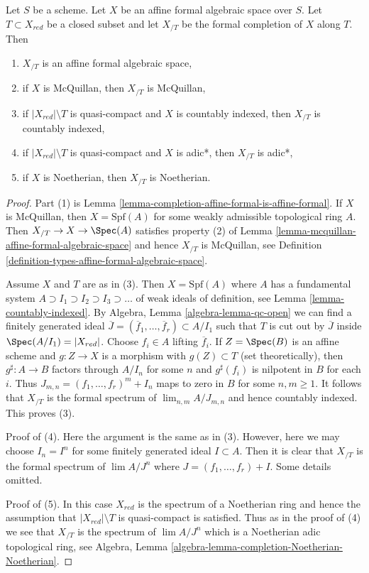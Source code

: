\begin{lemma}
\label{lemma-recompletion-affine-types}
Let $S$ be a scheme. Let $X$ be an affine formal algebraic space over $S$.
Let $T \subset X_{red}$ be a closed subset and let $X_{/T}$
be the formal completion of $X$ along $T$. Then
\begin{enumerate}
\item $X_{/T}$ is an affine formal algebraic space,
\item if $X$ is McQuillan, then $X_{/T}$ is McQuillan,
\item if $|X_{red}| \setminus T$ is quasi-compact and $X$
is countably indexed, then $X_{/T}$ is countably indexed,
\item if $|X_{red}| \setminus T$ is quasi-compact and $X$
is adic*, then $X_{/T}$ is adic*,
\item if $X$ is Noetherian, then $X_{/T}$ is Noetherian.
\end{enumerate}
\end{lemma}

\begin{proof}
Part (1) is Lemma \ref{lemma-completion-affine-formal-is-affine-formal}.
If $X$ is McQuillan, then $X = \text{Spf}(A)$ for some weakly admissible
topological ring $A$. Then $X_{/T} \to X \to \Spec(A)$ satisfies
property (2) of Lemma \ref{lemma-mcquillan-affine-formal-algebraic-space}
and hence $X_{/T}$ is McQuillan, see
Definition \ref{definition-types-affine-formal-algebraic-space}.

\medskip\noindent
Assume $X$ and $T$ are as in (3).
Then $X = \text{Spf}(A)$ where $A$ has a fundamental system
$A \supset I_1 \supset I_2 \supset I_3 \supset \ldots$
of weak ideals of definition, see Lemma \ref{lemma-countably-indexed}.
By Algebra, Lemma \ref{algebra-lemma-qc-open}
we can find a finitely generated ideal
$\overline{J} = (\overline{f}_1, \ldots, \overline{f}_r) \subset A/I_1$
such that $T$ is cut out by $\overline{J}$ inside $\Spec(A/I_1) = |X_{red}|$.
Choose $f_i \in A$ lifting $\overline{f}_i$.
If $Z = \Spec(B)$ is an affine scheme and $g : Z \to X$ is
a morphism with $g(Z) \subset T$ (set theoretically), then
$g^\sharp : A \to B$ factors through $A/I_n$ for some $n$
and $g^\sharp(f_i)$ is nilpotent in $B$ for each $i$. Thus
$J_{m, n} = (f_1, \ldots, f_r)^m + I_n$ maps to zero in $B$
for some $n, m \geq 1$. It follows that $X_{/T}$ is the formal spectrum of
$\lim_{n, m} A/J_{m, n}$ and hence countably indexed.
This proves (3).

\medskip\noindent
Proof of (4). Here the argument is the same as in (3).
However, here we may choose $I_n = I^n$ for some finitely generated ideal
$I \subset A$. Then it is clear that $X_{/T}$ is the formal spectrum of
$\lim A/J^n$ where $J = (f_1, \ldots, f_r) + I$. Some details omitted.

\medskip\noindent
Proof of (5). In this case $X_{red}$ is the spectrum of a Noetherian ring
and hence the assumption that $|X_{red}| \setminus T$ is quasi-compact
is satisfied. Thus as in the proof of (4) we see that
$X_{/T}$ is the spectrum of $\lim A/J^n$ which is a Noetherian
adic topological ring, see
Algebra, Lemma \ref{algebra-lemma-completion-Noetherian-Noetherian}.
\end{proof}

